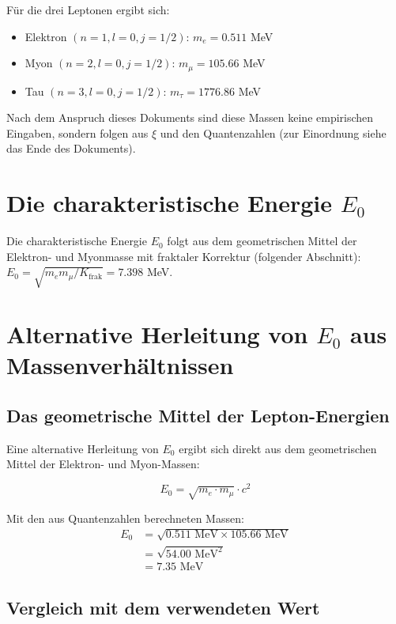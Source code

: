 	Für die drei Leptonen ergibt sich:
	
	\begin{itemize}
		\item Elektron $(n=1, l=0, j=1/2)$: $m_e = 0.511$ MeV
		\item Myon $(n=2, l=0, j=1/2)$: $m_\mu = 105.66$ MeV
		\item Tau $(n=3, l=0, j=1/2)$: $m_\tau = 1776.86$ MeV
	\end{itemize}
	
	Nach dem Anspruch dieses Dokuments sind diese Massen keine empirischen Eingaben, sondern folgen aus $\xi$ und den Quantenzahlen (zur Einordnung siehe das Ende des Dokuments).
	
	\section{Die charakteristische Energie $E_0$}
	
	Die charakteristische Energie $E_0$ folgt aus dem geometrischen Mittel der Elektron- und Myonmasse mit fraktaler Korrektur (folgender Abschnitt): $E_0 = \sqrt{m_e m_\mu/K_{\text{frak}}} = 7.398$ MeV.
	
	\section{Alternative Herleitung von $E_0$ aus Massenverhältnissen}
	
	\subsection{Das geometrische Mittel der Lepton-Energien}
	
	Eine alternative Herleitung von $E_0$ ergibt sich direkt aus dem geometrischen Mittel der Elektron- und Myon-Massen:
	
	\begin{equation}
		E_0 = \sqrt{m_e \cdot m_\mu} \cdot c^2
	\end{equation}
	
	Mit den aus Quantenzahlen berechneten Massen:
	\begin{align}
		E_0 &= \sqrt{0.511 \text{ MeV} \times 105.66 \text{ MeV}}\\
		&= \sqrt{54.00 \text{ MeV}^2}\\
		&= 7.35 \text{ MeV}
	\end{align}
	
	\subsection{Vergleich mit dem verwendeten Wert}
	
